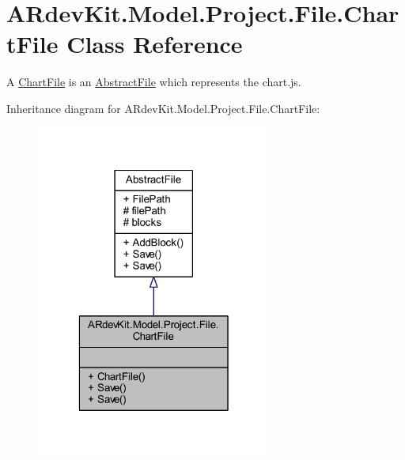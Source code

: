 \hypertarget{class_a_rdev_kit_1_1_model_1_1_project_1_1_file_1_1_chart_file}{\section{A\-Rdev\-Kit.\-Model.\-Project.\-File.\-Chart\-File Class Reference}
\label{class_a_rdev_kit_1_1_model_1_1_project_1_1_file_1_1_chart_file}
}


A \hyperlink{class_a_rdev_kit_1_1_model_1_1_project_1_1_file_1_1_chart_file}{Chart\-File} is an \hyperlink{class_a_rdev_kit_1_1_model_1_1_project_1_1_file_1_1_abstract_file}{Abstract\-File} which represents the chart.\-js.  




Inheritance diagram for A\-Rdev\-Kit.\-Model.\-Project.\-File.\-Chart\-File\-:
\nopagebreak
\begin{figure}[H]
\begin{center}
\leavevmode
\includegraphics[width=220pt]{class_a_rdev_kit_1_1_model_1_1_project_1_1_file_1_1_chart_file__inherit__graph}
\end{center}
\end{figure}


